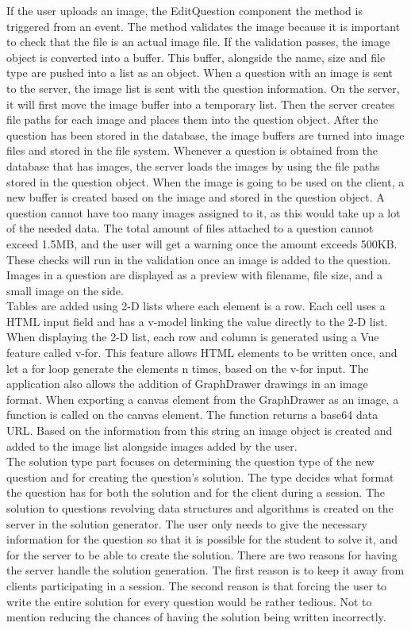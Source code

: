 If the user uploads an image, the EditQuestion component the method  is triggered from an  event. The method validates the image because it is important to check that the file is an actual image file. If the validation passes, the image  object is converted into a buffer. This buffer, alongside the name, size and file type are pushed into a list as an object. When a question with an image is sent to the server, the image list is sent with the question information. On the server, it will first move the image buffer into a temporary list. Then the server creates file paths for each image and places them into the question object. After the question has been stored in the database, the image buffers are turned into image files and stored in the file system. Whenever a question is obtained from the database that has images, the server loads the images by using the file paths stored in the question object. When the image is going to be used on the client, a new buffer is created based on the image and stored in the question object. A question cannot have too many images assigned to it, as this would take up a lot of the needed data. The total amount of files attached to a question cannot exceed 1.5MB, and the user will get a warning once the amount exceeds 500KB. These checks will run in the validation once an image is added to the question. Images in a question are displayed as a preview with filename, file size, and a small image on the side.
\\[11pt]
Tables are added using 2-D lists where each element is a row. Each cell uses a HTML input field and has a v-model linking the value directly to the 2-D list. When displaying the 2-D list, each row and column is generated using a Vue feature called v-for. This feature allows HTML elements to be written once, and let a for loop generate the elements n times, based on the v-for input. The application also allows the addition of GraphDrawer drawings in an image format. When exporting a canvas element from the GraphDrawer as an image, a function  is called on the canvas element. The function returns a base64 data URL. Based on the information from this string an image object is created and added to the image list alongside images added by the user.
\\[11pt]
The solution type part focuses on determining the question type of the new question and for creating the question's solution. The type decides what format the question has for both the solution and for the client during a session. The solution to questions revolving data structures and algorithms is created on the server in the solution generator. The user only needs to give the necessary information for the question so that it is possible for the student to solve it, and for the server to be able to create the solution. There are two reasons for having the server handle the solution generation. The first reason is to keep it away from clients participating in a session. The second reason is that forcing the user to write the entire solution for every question would be rather tedious. Not to mention reducing the chances of having the solution being written incorrectly.
